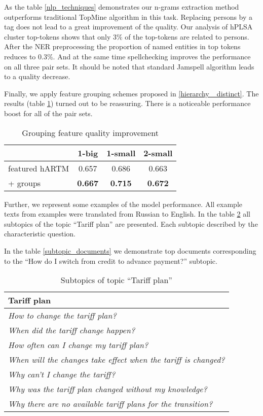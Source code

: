 As the table \ref{nlp_techniques} demonstrates our n-grams extraction method outperforms traditional TopMine algorithm in this task. Replacing persons by a tag does not lead to a great improvement of the quality. Our analysis of hPLSA cluster top-tokens shows that only $3\%$ of the top-tokens are related to persons. After the NER preprocessing the proportion of named entities in top tokens reduces to $0.3\%$. And at the same time spellchecking improves the performance on all three pair sets. It should be noted that standard Jamspell algorithm leads to a quality decrease. 

Finally, we apply feature grouping schemes proposed in \ref{hierarchy_ distinct}. The results (table \ref{results}) turned out to be reassuring. There is a noticeable performance boost for all of the pair sets. 

\begin{table}[!h]
    \centering
\begin{tabular}{p{2.7cm}|c|c|c}
    \hline
    & 1-big            & 1-small            & 2-small            \\ \hline
    featured hARTM         & 0.657          & 0.686          & 0.663          \\
    + groups & \textbf{0.667} & \textbf{0.715} & \textbf{0.672} \\ \hline
\end{tabular}
    \caption{Grouping feature quality improvement}
    \label{results}
\end{table}


Further, we represent some examples of the model performance. All example texts from examples were translated from Russian to English. In the table \ref{topic_subtopic} all subtopics of the topic ``Tariff plan'' are presented. Each subtopic described by the characteristic question. 

In the table \ref{subtopic_documents} we demonstrate top documents corresponding to the ``How do I switch from credit to advance payment?'' subtopic.

\begin{table}[!h]
\begin{tabular}{p{7cm}}
  \hline
  \textbf{Tariff plan} \\
  \hline
  \textsl{How to change the tariff plan?} \\
  \textsl{When did the tariff change happen?} \\
  \textsl{How often can I change my tariff plan?} \\
  \textsl{When will the changes take effect when the tariff is changed?} \\
  \textsl{Why can't I change the tariff?} \\
  \textsl{Why was the tariff plan changed without my knowledge?} \\
  \textsl{Why there are no available tariff plans for the transition?} \\
  \hline
\end{tabular}
\caption{Subtopics of topic ``Tariff plan''}
\label{topic_subtopic}
\end{table}

